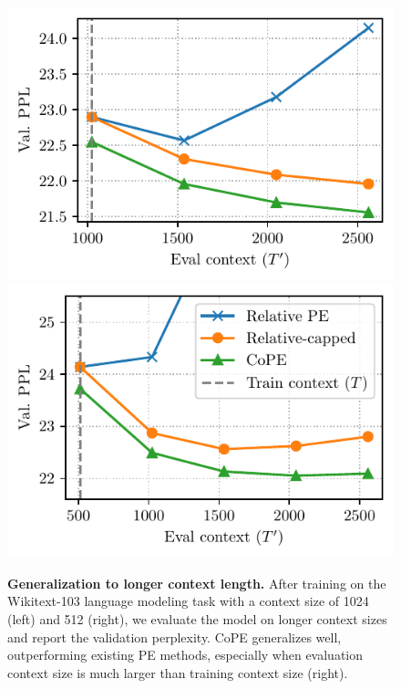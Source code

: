 \documentclass{article}
\newcommand{\ours}{CoPE\xspace}
\begin{document}
\begin{figure}[t]
  \centering
  \hfill
  \includegraphics[scale=0.7]{figs/wiki103_context.pdf}
  \hfill
  \includegraphics[scale=0.7]{figs/wiki103_context2.pdf}
  \hfill
  \caption{{\bf Generalization to longer context length.} After training on the Wikitext-103 language modeling task with a context size of 1024 (left) and 512 (right), we evaluate the model on longer context sizes and report the validation perplexity. %
  \ours{} generalizes well, outperforming existing PE methods, especially when evaluation context size is much larger than training context size (right).
  }
  \label{fig:wiki_context}
\end{figure}
\end{document}
